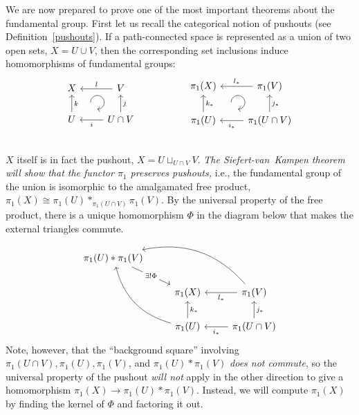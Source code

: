 We are now prepared to prove one of the most important theorems about the fundamental group. First let us recall the categorical notion of pushouts (see Definition~\ref{pushouts}). If a path-connected space is represented as a union of two open sets, $X=U\cup V$, then the corresponding set inclusions induce homomorphisms of fundamental groups:
\[
    \begin{tikzcd}[every matrix/.append style={name=m},   
    execute at end picture={\draw [<-] ([xshift=-8.5mm,yshift=1mm]m-2-2.north) arc[start angle=-90,delta angle=270,radius=0.25cm];}]
    X \arrow[r,leftarrow,"l"]\arrow[d,leftarrow,"k"]& V\arrow[d,leftarrow,"j"] \\
    U\arrow[r,,leftarrow,swap,"i"]& U\cap V\\
    \end{tikzcd}
    \quad\quad\quad\quad\quad
    \begin{tikzcd}[every matrix/.append style={name=m},   
    execute at end picture={\draw [<-] ([xshift=-11.5mm,yshift=1mm]m-2-2.north) arc[start angle=-90,delta angle=270,radius=0.25cm];}]
    \pi_1(X) \arrow[r,leftarrow,"l_\ast"]\arrow[d,leftarrow,"k_\ast"]& \pi_1(V)\arrow[d,leftarrow,"j_\ast"] \\
    \pi_1(U)\arrow[r,,leftarrow,swap,"i_\ast"]& \pi_1(U\cap V)\\
    \end{tikzcd}
\]
$X$ itself is in fact the pushout, $X=U\sqcup_{U\cap V}V$. \emph{The Siefert-van~Kampen theorem will show that the functor $\pi_1$ preserves pushouts,} i.e., the fundamental group of the union is isomorphic to the amalgamated free product, $\pi_1(X)\cong \pi_1(U) \ast_{\pi_1(U\cap V)} \pi_1(V)$. By the universal property of the free product, there is a unique homomorphism $\Phi$ in the diagram below that makes the external triangles commute.
\[
    \begin{tikzcd}
    \pi_1(U)\ast \pi_1(V)   \arrow[drr,leftarrow, bend left]   \arrow[ddr,leftarrow, bend right]   \arrow[dr,"\exists! \Phi" description] & & \\
        & \pi_1(X) \arrow[r,leftarrow,swap, "l_\ast"] \arrow[d,leftarrow, "k_\ast"]       & \pi_1(V) \arrow[d,leftarrow, "j_\ast"] \\ & \pi_1(U) \arrow[r,leftarrow,swap, "i_\ast"] &\pi_1(U\cap V) 
    \end{tikzcd}
\]
Note, however, that the ``background square'' involving $\pi_1(U\cap V),\pi_1(U),\pi_1(V)$, and $\pi_1(U)\ast \pi_1(V)$ \emph{does not commute}, so the universal property of the pushout \emph{will not} apply in the other direction to give a homomorphism $\pi_1(X)\to \pi_1(U)\ast\pi_1(V)$. Instead, we will compute $\pi_1(X)$ by finding the kernel of $\Phi$ and factoring it out.

